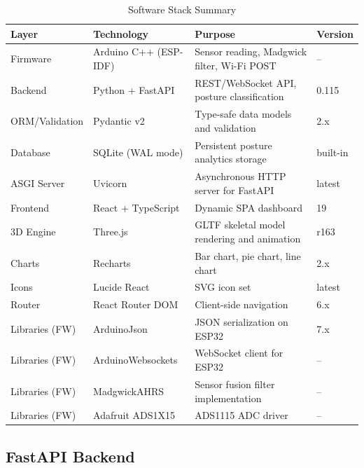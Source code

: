 \documentclass[12pt,a4paper]{report}
\begin{document}
\begin{table}[H]
\centering
\caption{Software Stack Summary}
\label{tab:software}
\begin{tabularx}{\columnwidth}{llXl}
\toprule
\textbf{Layer} & \textbf{Technology} & \textbf{Purpose} & \textbf{Version} \\
\midrule
Firmware       & Arduino C++ (ESP-IDF) & Sensor reading, Madgwick filter, Wi-Fi POST & -- \\
Backend        & Python + FastAPI      & REST/WebSocket API, posture classification  & 0.115 \\
ORM/Validation & Pydantic v2           & Type-safe data models and validation        & 2.x \\
Database       & SQLite (WAL mode)     & Persistent posture analytics storage        & built-in \\
ASGI Server    & Uvicorn               & Asynchronous HTTP server for FastAPI        & latest \\
Frontend       & React + TypeScript    & Dynamic SPA dashboard                       & 19 \\
3D Engine      & Three.js              & GLTF skeletal model rendering and animation & r163 \\
Charts         & Recharts              & Bar chart, pie chart, line chart            & 2.x \\
Icons          & Lucide React          & SVG icon set                                & latest \\
Router         & React Router DOM      & Client-side navigation                      & 6.x \\
Libraries (FW) & ArduinoJson           & JSON serialization on ESP32                 & 7.x \\
Libraries (FW) & ArduinoWebsockets     & WebSocket client for ESP32                  & -- \\
Libraries (FW) & MadgwickAHRS          & Sensor fusion filter implementation         & -- \\
Libraries (FW) & Adafruit ADS1X15      & ADS1115 ADC driver                          & -- \\
\bottomrule
\end{tabularx}
\end{table}

\subsection{FastAPI Backend}
\end{document}
